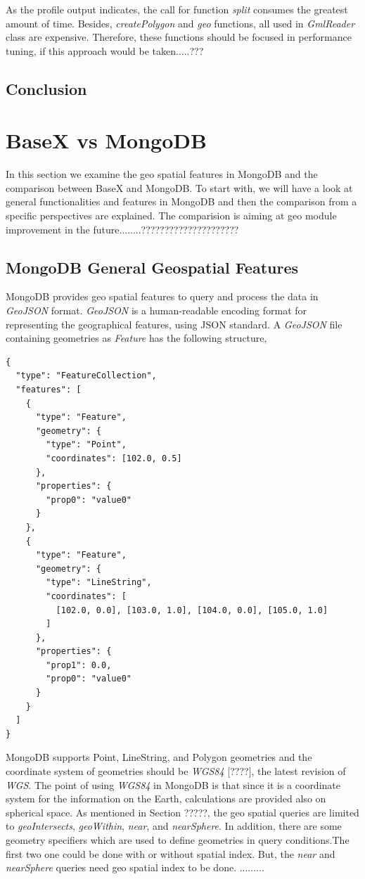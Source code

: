 \documentclass[a4paper,12pt]{article}
\begin{document}
As the profile output indicates, the call for function \textit{split} consumes the greatest amount of time. Besides, \textit{createPolygon} and \textit{geo} functions, all used in \textit{GmlReader} class are expensive. Therefore, these functions should be focused in performance tuning, if this approach would be taken.....???
\subsection{Conclusion}


\section{BaseX vs MongoDB}
\label{s.mongo}
In this section we examine the geo spatial features in MongoDB and the comparison between BaseX and MongoDB.
To start with, we will have a look at general functionalities and features in MongoDB and then the comparison from a specific perspectives are explained. The comparision is aiming at geo module improvement in the future........?????????????????????

\subsection {MongoDB General Geospatial Features}
MongoDB provides geo spatial features to query and process the data in \textit{GeoJSON} format. \textit{GeoJSON} is a human-readable encoding format for representing the geographical features, using JSON standard. A \textit{GeoJSON} file containing geometries as \textit{Feature} has the following structure,

\begin{verbatim}
{
  "type": "FeatureCollection",
  "features": [
    {
      "type": "Feature",
      "geometry": {
        "type": "Point",
        "coordinates": [102.0, 0.5]
      },
      "properties": {
        "prop0": "value0"
      }
    },
    {
      "type": "Feature",
      "geometry": {
        "type": "LineString",
        "coordinates": [
          [102.0, 0.0], [103.0, 1.0], [104.0, 0.0], [105.0, 1.0]
        ]
      },
      "properties": {
        "prop1": 0.0,
        "prop0": "value0"
      }
    }
  ]
}
\end{verbatim}


MongoDB supports Point, LineString, and Polygon geometries and the coordinate system of geometries should be \textit{WGS84} [????], the latest revision of \textit{WGS}. The point of using \textit{WGS84} in MongoDB is that since it is a coordinate system for the information on the Earth, calculations are provided also on spherical space. As mentioned in Section ?????, the geo spatial queries are limited to \textit{geoIntersects}, \textit{geoWithin}, \textit{near}, and \textit{nearSphere}. In addition, there are some geometry specifiers which are used to define geometries in query conditions.The first two one could be done with or without spatial index. But, the \textit{near} and \textit{nearSphere} queries need geo spatial index to be done.
.........
\end{document}
